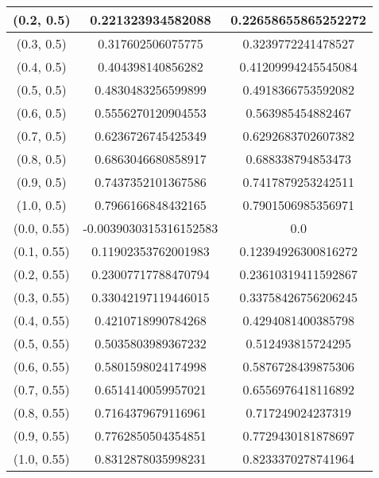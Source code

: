\begin{table}[H]
\begin{tabular}{|c|c|c|}
(0.2, 0.5) & 0.221323934582088 & 0.22658655865252272 \\
\hline
(0.3, 0.5) & 0.317602506075775 & 0.3239772241478527 \\
\hline
(0.4, 0.5) & 0.404398140856282 & 0.41209994245545084 \\
\hline
(0.5, 0.5) & 0.4830483256599899 & 0.4918366753592082 \\
\hline
(0.6, 0.5) & 0.5556270120904553 & 0.563985454882467 \\
\hline
(0.7, 0.5) & 0.6236726745425349 & 0.6292683702607382 \\
\hline
(0.8, 0.5) & 0.6863046680858917 & 0.688338794853473 \\
\hline
(0.9, 0.5) & 0.7437352101367586 & 0.7417879253242511 \\
\hline
(1.0, 0.5) & 0.7966166848432165 & 0.7901506985356971 \\
\hline
\hline
(0.0, 0.55) & -0.0039030315316152583 & 0.0 \\
\hline
(0.1, 0.55) & 0.11902353762001983 & 0.12394926300816272 \\
\hline
(0.2, 0.55) & 0.23007717788470794 & 0.23610319411592867 \\
\hline
(0.3, 0.55) & 0.33042197119446015 & 0.33758426756206245 \\
\hline
(0.4, 0.55) & 0.4210718990784268 & 0.4294081400385798 \\
\hline
(0.5, 0.55) & 0.5035803989367232 & 0.512493815724295 \\
\hline
(0.6, 0.55) & 0.5801598024174998 & 0.5876728439875306 \\
\hline
(0.7, 0.55) & 0.6514140059957021 & 0.6556976418116892 \\
\hline
(0.8, 0.55) & 0.7164379679116961 & 0.717249024237319 \\
\hline
(0.9, 0.55) & 0.7762850504354851 & 0.7729430181878697 \\
\hline
(1.0, 0.55) & 0.8312878035998231 & 0.8233370278741964 \\
\hline
\end{tabular}
\end{table}
